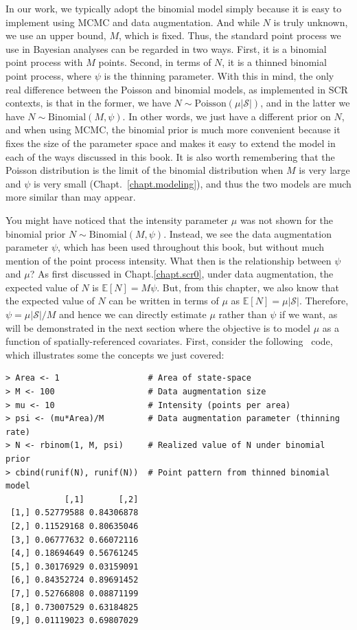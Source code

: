 In our work, we typically adopt the binomial model simply
because it is easy to implement using MCMC and data
augmentation. And while $N$ is truly unknown, we use an upper bound, $M$,
which is fixed. Thus, the standard point process we use in Bayesian
analyses can be
regarded in two ways. First, it is a binomial point process with $M$
points. Second, in terms of $N$, it is a thinned binomial point
process, where $\psi$ is the thinning parameter.
With this in mind,
the only real difference between the Poisson and binomial models, as
implemented in SCR contexts, is that in the former, we have
$N \sim \text{Poisson}(\mu|\mathcal{S}|)$, and in the latter we have
$N \sim \text{Binomial}(M, \psi)$. In other words, we just have a
different prior on $N$, and when using MCMC, the binomial prior is
much more convenient because it fixes the size of the parameter space
and makes it easy to extend the model in each of the ways discussed in
this book. It is also worth remembering that the Poisson
distribution is the limit of the binomial distribution when $M$ is
very large and $\psi$ is very small (Chapt.~\ref{chapt.modeling}), and
thus the two models are much more similar than may appear.

You might have noticed that the intensity parameter $\mu$ was not shown for the
binomial prior $N \sim \text{Binomial}(M, \psi)$. Instead, we see the
data augmentation parameter $\psi$, which has been used throughout
this book, but without much mention of the point process
intensity. What then is the relationship between $\psi$ and $\mu$?
As first discussed in Chapt.\ref{chapt.scr0}, under data augmentation,
the expected value of $N$ is $\mathbb{E}[N] = M\psi$. But, from this
chapter, we also know that the
expected value of $N$ can be written in terms of $\mu$ as
$\mathbb{E}[N] = \mu|\mathcal{S}|$. Therefore,
$\psi = \mu|\mathcal{S}| / M$ and hence we can directly estimate $\mu$
rather than $\psi$ if we want, as will be demonstrated
in the next
section where the objective is to model $\mu$ as a function of
spatially-referenced covariates. First, %
consider the following \R~code, which illustrates some the concepts we
just covered:
\begin{small}
\begin{verbatim}
> Area <- 1                  # Area of state-space
> M <- 100                   # Data augmentation size
> mu <- 10                   # Intensity (points per area)
> psi <- (mu*Area)/M         # Data augmentation parameter (thinning rate)
> N <- rbinom(1, M, psi)     # Realized value of N under binomial prior
> cbind(runif(N), runif(N))  # Point pattern from thinned binomial model
            [,1]       [,2]
 [1,] 0.52779588 0.84306878
 [2,] 0.11529168 0.80635046
 [3,] 0.06777632 0.66072116
 [4,] 0.18694649 0.56761245
 [5,] 0.30176929 0.03159091
 [6,] 0.84352724 0.89691452
 [7,] 0.52766808 0.08871199
 [8,] 0.73007529 0.63184825
 [9,] 0.01119023 0.69807029
\end{verbatim}
\end{small}


